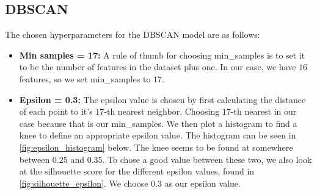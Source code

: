 \subsection{DBSCAN}

The chosen hyperparameters for the DBSCAN model are as follows:

\begin{itemize}
    \item \textbf{Min samples = 17:} A rule of thumb for choosing min\_samples is to set it to be the number of features in the dataset plus one. In our case, we have $16$ features, so we set min\_samples to $17$.
    \item \textbf{Epsilon = 0.3:} The epsilon value is chosen by first calculating the distance of each point to it's $17$-th nearest neighbor. Choosing $17$-th nearest in our case because that is our min\_samples. We then plot a histogram to find a knee to define an appropriate epsilon value. The histogram can be seen in \autoref{fig:epsilon_histogram} below. The knee seems to be found at somewhere between $0.25$ and $0.35$. To chose a good value between these two, we also look at the silhouette score for the different epsilon values, found in \autoref{fig:silhouette_epsilon}. We choose $0.3$ as our epsilon value.
\end{itemize}
\vspace{-0.4cm}
